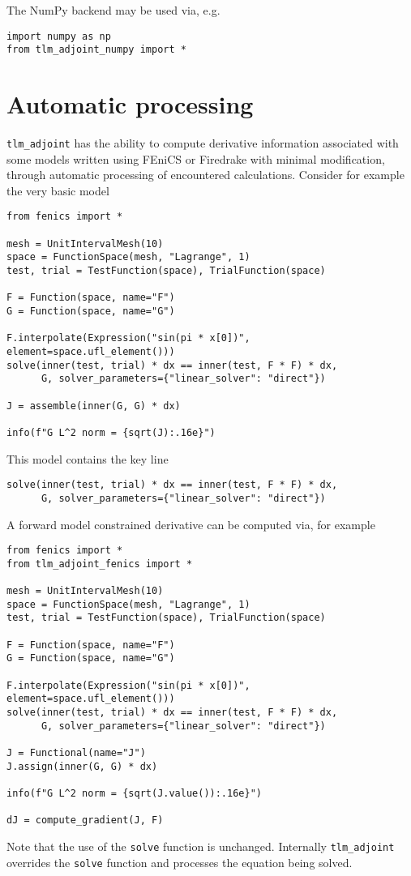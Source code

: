 \documentclass[11pt]{article}
\begin{document}
The NumPy backend may be used via, e.g.
\begin{lstlisting}
import numpy as np
from tlm_adjoint_numpy import *
\end{lstlisting}

\section{Automatic processing}\label{sect:overrides}

\texttt{tlm\_adjoint} has the ability to compute derivative information
associated with some models written using FEniCS or Firedrake with minimal
modification, through automatic processing of encountered calculations.
Consider for example the very basic model
\begin{lstlisting}
from fenics import *

mesh = UnitIntervalMesh(10)
space = FunctionSpace(mesh, "Lagrange", 1)
test, trial = TestFunction(space), TrialFunction(space)

F = Function(space, name="F")
G = Function(space, name="G")

F.interpolate(Expression("sin(pi * x[0])", element=space.ufl_element()))
solve(inner(test, trial) * dx == inner(test, F * F) * dx,
      G, solver_parameters={"linear_solver": "direct"})

J = assemble(inner(G, G) * dx)

info(f"G L^2 norm = {sqrt(J):.16e}")
\end{lstlisting}
This model contains the key line
\begin{lstlisting}
solve(inner(test, trial) * dx == inner(test, F * F) * dx,
      G, solver_parameters={"linear_solver": "direct"})
\end{lstlisting}

A forward model constrained derivative can be computed via, for example
\begin{lstlisting}
from fenics import *
from tlm_adjoint_fenics import *

mesh = UnitIntervalMesh(10)
space = FunctionSpace(mesh, "Lagrange", 1)
test, trial = TestFunction(space), TrialFunction(space)

F = Function(space, name="F")
G = Function(space, name="G")

F.interpolate(Expression("sin(pi * x[0])", element=space.ufl_element()))
solve(inner(test, trial) * dx == inner(test, F * F) * dx,
      G, solver_parameters={"linear_solver": "direct"})

J = Functional(name="J")
J.assign(inner(G, G) * dx)

info(f"G L^2 norm = {sqrt(J.value()):.16e}")

dJ = compute_gradient(J, F)
\end{lstlisting}
Note that the use of the \texttt{solve} function is unchanged. Internally
\texttt{tlm\_adjoint} overrides the \texttt{solve} function and processes the
equation being solved.
\end{document}
